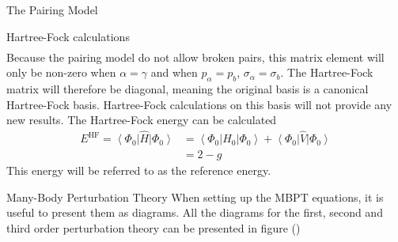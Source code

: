 \documentclass[twoside,english]{uiofysmaster}
\begin{document}
\begin{chapter}{The Pairing Model}
\begin{section}{Hartree-Fock calculations}
\begin{align}
 		\end{align}
 		Because the pairing model do not allow broken pairs, this matrix element will only be non-zero when $\alpha = \gamma$ and when $p_{\alpha} = p_{b}$, $\sigma_ \alpha = \sigma_b$. The Hartree-Fock matrix will therefore be diagonal, meaning the original basis is a canonical Hartree-Fock basis. Hartree-Fock calculations on this basis will not provide any new results. The Hartree-Fock energy can be calculated
 		\begin{align}
 			E^{\text{HF}} = \left< \Phi_0 \right| \hat H \left| \Phi_0 \right> &= \left< \Phi_0 \right| \hat H_0 \left| \Phi_0 \right> + \left< \Phi_0 \right| \hat V \left| \Phi_0 \right> \\
 			&= 2 - g 
 		\end{align}
 		This energy will be referred to as the reference energy. 
 	\end{section}

	\begin{section}{Many-Body Perturbation Theory}
 		When setting up the MBPT equations, it is useful to present them as diagrams. All the diagrams for the first, second and third order perturbation theory can be presented in figure ()
 		

\end{section}
\end{chapter}
\end{document}
